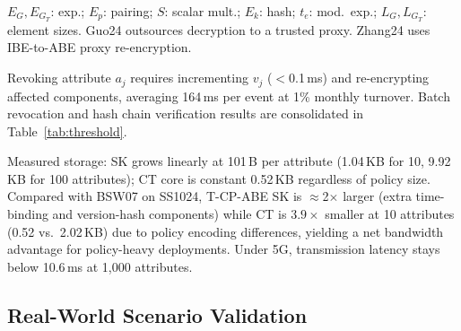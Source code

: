 ﻿\documentclass[lettersize,journal]{IEEEtran}
\begin{document}
\begin{table}[!t]
\renewcommand{\arraystretch}{1.1}
\caption{Theoretical complexity comparison. $|S_T|$: policy attrs; $|S_U|$: user attrs; $N$: hash chain length.}
\label{tab:sota_comparison}
\centering
\footnotesize
{}
\vspace{1mm}

\begin{flushleft}
\footnotesize
$E_G, E_{G_T}$: exp.; $E_p$: pairing; $S$: scalar mult.; $E_k$: hash; $t_e$: mod.\ exp.; $L_G, L_{G_T}$: element sizes.
Guo24 outsources decryption to a trusted proxy. Zhang24 uses IBE-to-ABE proxy re-encryption.
\end{flushleft}
\end{table}

Revoking attribute $a_j$ requires incrementing $v_j$ ($<$0.1\,ms) and
re-encrypting affected components, averaging 164\,ms per event at 1\%
monthly turnover. Batch revocation and hash chain verification
results are consolidated in Table~\ref{tab:threshold}.

Measured storage: SK grows linearly at 101\,B per attribute
(1.04\,KB for 10, 9.92\,KB for 100 attributes); CT core is
constant 0.52\,KB regardless of policy size.
Compared with BSW07 on SS1024,
T-CP-ABE SK is $\approx$2$\times$ larger (extra time-binding and
version-hash components) while CT is
$3.9\times$ smaller at 10 attributes
(0.52 vs.\ 2.02\,KB) due to policy encoding
differences, yielding a net bandwidth advantage for
policy-heavy deployments. Under 5G,
transmission latency stays below 10.6\,ms at 1,000 attributes.

\subsection{Real-World Scenario Validation}
\label{subsec:real_world}
\end{document}
